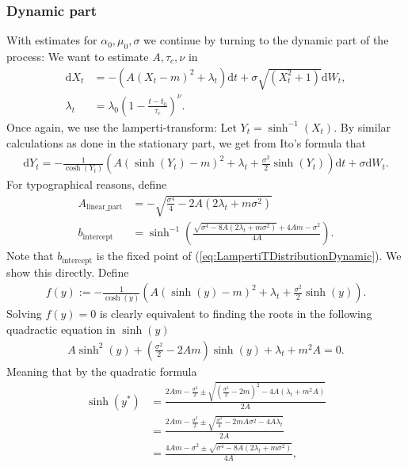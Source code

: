 \subsubsection{Dynamic part}
With estimates for $\alpha_0, \mu_0, \sigma$ we continue by turning to the dynamic part of the process: We want to estimate $A, \tau_c, \nu$ in
\begin{align}
    \mathrm{d}X_t &= -\left(A(X_t - m)^2 + \lambda_t\right)\mathrm{d}t + \sigma \sqrt{\left(X_t^2 + 1\right)}\mathrm{d}W_t,\\
    \lambda_t &= \lambda_0 \left(1 - \frac{t - t_0}{\tau_c}\right)^\nu.
\end{align}
Once again, we use the lamperti-transform: Let $Y_t = \sinh^{-1}(X_t)$. By similar calculations as done in the stationary part, we get from Ito's formula that
\begin{align}
    \mathrm{d}Y_t = -\frac{1}{\cosh(Y_t)}\left(A\left(\sinh(Y_t) - m\right)^2 + \lambda_t + \frac{\sigma^2}{2}\sinh(Y_t)\right)\mathrm{d}t + \sigma \mathrm{d}W_t. \label{eq:LampertiTDistributionDynamic}
\end{align}
For typographical reasons, define
\begin{align}
    A_{\textrm{linear\_part}} &= -\sqrt{\frac{\sigma^4}{4} - 2A\left(2\lambda_t + m\sigma^2\right)}\\
    b_{\textrm{intercept}} &= \sinh^{-1}\left(\frac{\sqrt{\sigma^4 - 8A\left(2\lambda_t + m \sigma^2\right)} + 4 Am - \sigma^2}{4A}\right).
\end{align}
Note that $b_{\textrm{intercept}}$ is the fixed point of (\ref{eq:LampertiTDistributionDynamic}). We show this directly. Define
\begin{align}
    f(y) := -\frac{1}{\cosh(y)}\left(A\left(\sinh(y) - m\right)^2 + \lambda_t + \frac{\sigma^2}{2}\sinh(y)\right).
\end{align}
Solving $f(y) = 0$ is clearly equivalent to finding the roots in the following quadractic equation in $\sinh(y)$
\begin{align}
    A\sinh^2(y) + \left(\frac{\sigma^2}{2} - 2Am\right)\sinh(y) + \lambda_t + m^2A = 0.
\end{align}
Meaning that by the quadratic formula
\begin{align}
    \sinh(y^*) &= \frac{2Am-\frac{\sigma^2}{2}\pm\sqrt{\left(\frac{\sigma^2}{2} - 2m\right)^2 - 4A\left(\lambda_t + m^2 A\right)}}{2A}\nonumber\\
    &= \frac{2Am-\frac{\sigma^2}{2}\pm\sqrt{\frac{\sigma^4}{4}-2mA\sigma^2 - 4A\lambda_t}}{2A}\nonumber\\
    &= \frac{4Am-\sigma^2\pm\sqrt{\sigma^4-8A\left(2\lambda_t + m\sigma^2\right)}}{4A},
\end{align}
